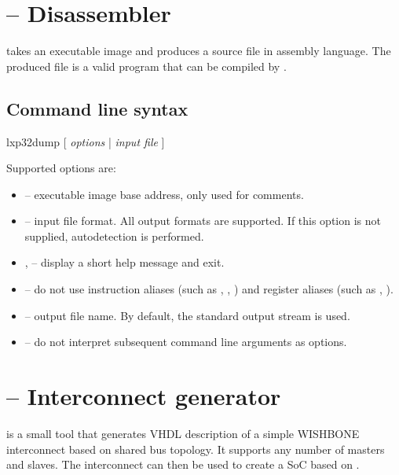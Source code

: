 \documentclass[a4paper,12pt,twoside,extrafontsizes]{memoir}
\begin{document}
\section{ -- Disassembler}

 takes an executable image and produces a source file in \lxp{} assembly language. The produced file is a valid program that can be compiled by .

\subsection{Command line syntax}

\begin{codepar}
    lxp32dump [ \emph{options} | \emph{input file} ]
\end{codepar}

Supported options are:

\begin{itemize}
	\item {} -- executable image base address, only used for comments.
	
	\item {} -- input file format. All  output formats are supported. If this option is not supplied, autodetection is performed.
	
	\item {},  -- display a short help message and exit.
	
	\item {} -- do not use instruction aliases (such as , , ) and register aliases (such as , ).
	
	\item {} -- output file name. By default, the standard output stream is used.
	
	\item \shellcmd{--} -- do not interpret subsequent command line arguments as options.
\end{itemize}

\section{ -- Interconnect generator}

 is a small tool that generates VHDL description of a simple WISHBONE interconnect based on shared bus topology. It supports any number of masters and slaves. The interconnect can then be used to create a SoC based on \lxp{}.
\end{document}
